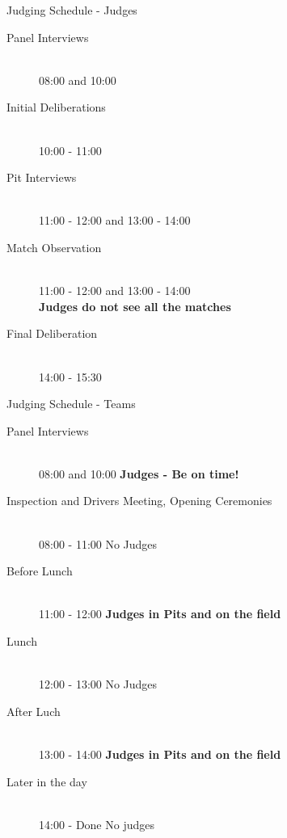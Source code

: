 \documentclass{beamer}
\begin{document}
  \begin{frame}{Judging Schedule - Judges}
    \begin{description}
    \item[Panel Interviews] \hfill \\ 08:00 and 10:00
    \item[Initial Deliberations] \hfill \\ 10:00 - 11:00
    \item[Pit Interviews] \hfill  \\ 11:00 - 12:00 and 13:00 - 14:00
    \item[Match Observation] \hfill \\ 11:00 - 12:00 and 13:00 - 14:00 \\
      \textbf{Judges do not see all the matches}
    \item[Final Deliberation] \hfill \\ 14:00 - 15:30
    \end{description}
  \end{frame}

  \begin{frame}{Judging Schedule - Teams}
    \begin{description}
    \item[Panel Interviews] \hfill
      \\ 08:00 and 10:00 \textbf{Judges - Be on time!}
    \item[Inspection and Drivers Meeting, Opening Ceremonies] \hfill \\
      08:00 - 11:00 No Judges
    \item[Before Lunch] \hfill \\
      11:00 - 12:00 \textbf{Judges in Pits and on the field}
    \item[Lunch] \hfill \\
      12:00 - 13:00 No Judges
    \item[After Luch] \hfill \\
      13:00 - 14:00 \textbf{Judges in Pits and on the field}
    \item[Later in the day] \hfill \\
      14:00 - Done No judges
    \end{description}
  \end{frame}
\end{document}
